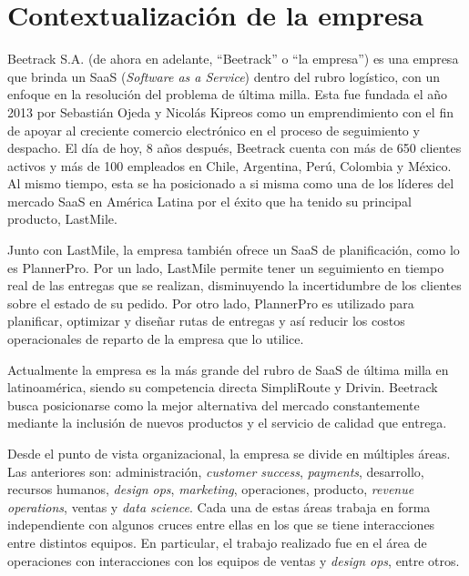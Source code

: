 \section{Contextualización de la empresa}
    
    Beetrack S.A. (de ahora en adelante, ``Beetrack'' o ``la empresa'') es una empresa que brinda un SaaS (\textit{Software as a Service}) dentro del rubro logístico, con un enfoque en la resolución del problema de última milla. Esta fue fundada el año 2013 por Sebastián Ojeda y Nicolás Kipreos como un emprendimiento con el fin de apoyar al creciente comercio electrónico en el proceso de seguimiento y despacho. El día de hoy, 8 años después, Beetrack cuenta con más de 650 clientes activos y más de 100 empleados \cite{corporateit} en Chile, Argentina, Perú, Colombia y México. Al mismo tiempo, esta se ha posicionado a si misma como una de los líderes del mercado SaaS en América Latina por el éxito que ha tenido su principal producto, LastMile.

    Junto con LastMile, la empresa también ofrece un SaaS de planificación, como lo es PlannerPro. Por un lado, LastMile permite tener un seguimiento en tiempo real de las entregas que se realizan, disminuyendo la incertidumbre de los clientes sobre el estado de su pedido. Por otro lado, PlannerPro es utilizado para planificar, optimizar y diseñar rutas de entregas y así  reducir los costos operacionales de reparto de la empresa que lo utilice.
    
    Actualmente la empresa es la más grande del rubro de SaaS de última milla en latinoamérica, siendo su competencia directa SimpliRoute y Drivin. Beetrack busca posicionarse como la mejor alternativa del mercado constantemente mediante la inclusión de nuevos productos y el servicio de calidad que entrega.
    
    Desde el punto de vista organizacional, la empresa se divide en múltiples áreas. Las anteriores son: administración, \textit{customer success}, \textit{payments}, desarrollo, recursos humanos, \textit{design ops}, \textit{marketing}, operaciones, producto, \textit{revenue operations}, ventas y \textit{data science}. Cada una de estas áreas trabaja en forma independiente con algunos cruces entre ellas en los que se tiene interacciones entre distintos equipos. En particular, el trabajo realizado fue en el área de operaciones con interacciones con los equipos de ventas y \textit{design ops}, entre otros.

